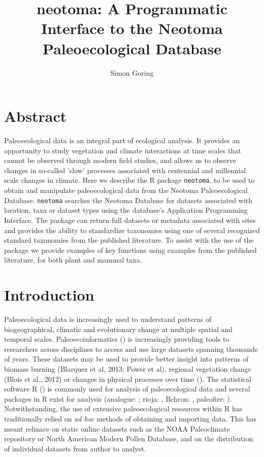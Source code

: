 \documentclass{article}
\title{neotoma: A Programmatic Interface to the Neotoma Paleoecological Database}
\author{Simon Goring}
\begin{document}

\maketitle

\section*{Abstract}

Paleoecological data is an integral part of ecological analysis.  It provides an opportunity to study vegetation and climate interactions at time scales that cannot be observed through modern field studies, and allows us to observe changes in so-called 'slow' processes associated with centennial and millennial scale changes in climate.
Here we describe the R package \texttt{neotoma}, to be used to obtain and manipulate paleoecological data from the Neotoma Paleoecological Database.  \texttt{neotoma} searches the Neotoma Database for datasets associated with location, taxa or dataset types using the database's Application Programming Interface.  The package can return full datasets or metadata associated with sites and provides the ability to standardize taxonomies using one of several recognized standard taxonomies from the published literature.
To assist with the use of the package we provide examples of key functions using examples from the published literature, for both plant and mammal taxa.

\section*{Introduction}
Paleoecological data is increasingly used to understand patterns of biogeographical, climatic and evolutionary change at multiple spatial and temporal scales.  Paleoecoinformatics (\cite{brewer2012paleo}) is increasingly providing tools to researchers across disciplines to access and use large datasets spanning thousands of years.  These datasets may be used to provide better insight into patterns of biomass burning (Blarquez et al, 2013; Power et al), regional vegetation change (Blois et al., 2012) or changes in physical processes over time (\cite{goring2012depo}).  The statistical software R (\cite{RCoreTeam2014}) is commonly used for analysis of paleoecological data and several packages in R exist for analysis (analogue: \cite{analogue2013, analogue2007}; rioja: \cite{rioja2013}, Bchron: \cite{bchron2014}, paleofire: \cite{paleofire2014}). Notwithstanding, the use of extensive paleoecological resources within R has traditionally relied on \emph{ad hoc} methods of obtaining and importing data.  This has meant reliance on static online datasets such as the NOAA Paleoclimate repository or North American Modern Pollen Database, and on the distribution of individual datasets from author to analyst.
\end{document}
